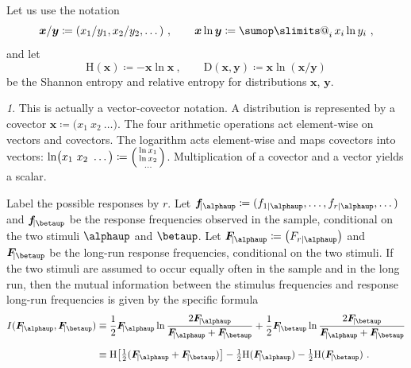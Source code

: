\documentclass[\ifafour a4paper,12pt,\else a5paper,10pt,\fi%
onecolumn,oneside,article,%
british%
]{memoir}
\makeatletter
\theoremstyle{remark}
\theoremstyle{innote}
\newtheorem*{innote}{}
\def\sum{\DOTSI\sumop\slimits@}
\newcommand*{\defd}{\coloneqq}
\renewcommand*{\|}[1][]{\nonscript\,#1\vert\nonscript\;\mathopen{}}
\renewcommand*{\=}{\TextOrMath\texteq\eq}
\newcommand*{\tsum}{\mathop{\textstyle\sum}\nolimits}
\newcommand*{\yffa}[1]{f_{#1\|\alphaup}}
\newcommand*{\yfa}{\bm{f}_{\!\|\alphaup}}
\newcommand*{\yfb}{\bm{f}_{\!\|\betaup}}
\newcommand*{\yFFa}[1]{F_{#1\|\alphaup}}
\newcommand*{\yFa}{\bm{F}_{\!\|\alphaup}}
\newcommand*{\yFb}{\bm{F}_{\!\|\betaup}}
\newcommand*{\hh}{\textrm{H}}
\newcommand*{\dd}{\textrm{D}}
\newcommand*{\ii}{I}%
\makeatother
\begin{document}
Let us use the notation
\begin{equation}
  \label{eq:sum_noindices}
  \bm{x}/\bm{y} \defd (x_{1}/y_{1},  x_{2}/y_{2}, \dotsc) \ ,
  \qquad
  \bm{x} \ln\bm{y} \defd \tsum_{i} x_{i} \ln y_{i} \ ,
\end{equation}
and let
\begin{equation}
  \label{eq:entropies}
  \hh(\bm{x}) \defd -\bm{x}\ln\bm{x}\ ,
  \qquad
  \dd(\bm{x} , \bm{y}) \defd \bm{x}\ln(\bm{x}/\bm{y})
\end{equation}
be the Shannon entropy and relative entropy for distributions $\bm{x}$,
$\bm{y}$.
\begin{innote}
  This is actually a vector-covector notation. A distribution is
  represented by a covector
  $\bm{x} \defd \bigl( x_{1}\ x_{2}\ \dotso\bigr)$. The four arithmetic
  operations act element-wise on vectors and covectors. The logarithm acts
  element-wise and maps covectors into vectors:
  $\ln\bigl( x_{1}\ x_{2}\ \dotso\bigr) \defd \Bigl(\begin{smallmatrix} \ln
    x_{1}\\ \ln x_{2}\\\dotso
  \end{smallmatrix}\Bigr)$.
  Multiplication of a covector and a vector yields a scalar.
\end{innote}

Label the possible responses by $r$. Let
$\yfa \defd (\yffa{1}, \dotsc, \yffa{r},\dotsc)$ and $\yfb$ be the response
frequencies observed in the sample, conditional on the two stimuli
$\alphaup$ and $\betaup$. Let $\yFa \defd \bigl(\yFFa{r} \bigr)$ and $\yFb$
be the long-run response frequencies, conditional on the two 
stimuli. If the two stimuli are assumed to occur equally often
in the sample and in the long run, then the mutual information between the
stimulus frequencies and response long-run frequencies is given by the
specific formula
\begin{equation}
  \label{eq:mutual_info_specific}
  \begin{split}
  \ii(\yFa, \yFb) &\equiv
 \frac{1}{2}\yFa\ln\frac{2\yFa}{\yFa + \yFb} +
  \frac{1}{2}\yFb\ln\frac{2\yFb}{\yFa + \yFb}
  \\[2\jot]
  &\equiv \hh\bigl[\tfrac{1}{2}(\yFa + \yFb)\bigr]
  - \tfrac{1}{2} \hh(\yFa) - \tfrac{1}{2} \hh(\yFb)
  \ .
\end{split}
\end{equation}
\end{document}
